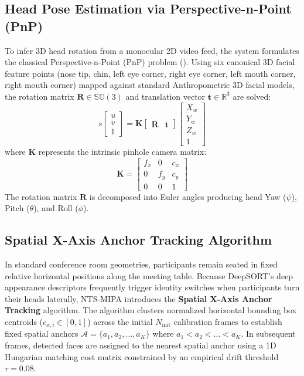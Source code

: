 \documentclass[12pt,a4paper,oneside]{report}
\providecommand{\parencite}[1]{(\cite{#1})}
\begin{document}
\subsection{Head Pose Estimation via Perspective-n-Point (PnP)}
To infer 3D head rotation from a monocular 2D video feed, the system formulates the classical Perspective-n-Point (PnP) problem \parencite{lepetit2009epnp}. Using six canonical 3D facial feature points (nose tip, chin, left eye corner, right eye corner, left mouth corner, right mouth corner) mapped against standard Anthropometric 3D facial models, the rotation matrix $\mathbf{R} \in \mathbb{SO}(3)$ and translation vector $\mathbf{t} \in \mathbb{R}^3$ are solved:
\begin{equation}
    s \begin{bmatrix} u \\ v \\ 1 \end{bmatrix} = \mathbf{K} \begin{bmatrix} \mathbf{R} & \mathbf{t} \end{bmatrix} \begin{bmatrix} X_w \\ Y_w \\ Z_w \\ 1 \end{bmatrix}
\end{equation}
where $\mathbf{K}$ represents the intrinsic pinhole camera matrix:
\begin{equation}
    \mathbf{K} = \begin{bmatrix} f_x & 0 & c_x \\ 0 & f_y & c_y \\ 0 & 0 & 1 \end{bmatrix}
\end{equation}
The rotation matrix $\mathbf{R}$ is decomposed into Euler angles producing head Yaw ($\psi$), Pitch ($\theta$), and Roll ($\phi$).

\subsection{Spatial X-Axis Anchor Tracking Algorithm}
In standard conference room geometries, participants remain seated in fixed relative horizontal positions along the meeting table. Because DeepSORT's deep appearance descriptors frequently trigger identity switches when participants turn their heads laterally, NTS-MIPA introduces the \textbf{Spatial X-Axis Anchor Tracking} algorithm. The algorithm clusters normalized horizontal bounding box centroids ($c_{x,i} \in [0, 1]$) across the initial $N_{\text{init}}$ calibration frames to establish fixed spatial anchors $\mathcal{A} = \{a_1, a_2, \dots, a_K\}$ where $a_1 < a_2 < \dots < a_K$. In subsequent frames, detected faces are assigned to the nearest spatial anchor using a 1D Hungarian matching cost matrix constrained by an empirical drift threshold $\tau = 0.08$.
\end{document}
